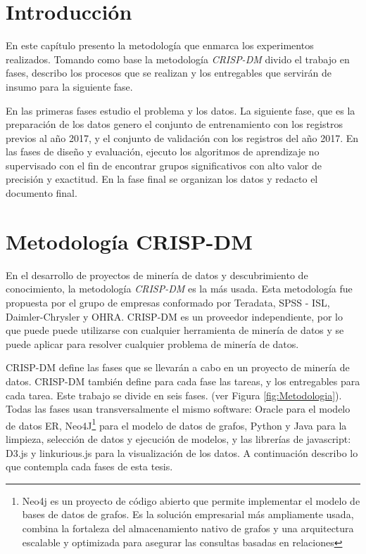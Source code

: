 \section{Introducción}
En este capítulo presento la metodología que enmarca los experimentos realizados. Tomando como base la metodología \textit{\acrfull{CRISP-DM}} divido el trabajo en fases, describo los procesos que se realizan y los entregables que servirán de insumo para la siguiente fase.

En las primeras fases estudio el problema y los datos. La siguiente fase, que es la preparación de los datos genero el conjunto de entrenamiento con los registros previos al año 2017, y el conjunto de validación con los registros del año 2017. En las fases de diseño y evaluación, ejecuto los algoritmos de aprendizaje no supervisado con el fin de encontrar grupos significativos con alto valor de precisión y exactitud. En la fase final se organizan los datos y  redacto el documento final.

\section{Metodología CRISP-DM}
En el desarrollo de proyectos de minería de datos y descubrimiento de conocimiento, la metodología \textit{\acrfull{CRISP-DM}} es la más usada. Esta metodología fue propuesta por el grupo de empresas conformado por Teradata,
SPSS - ISL, Daimler-Chrysler y OHRA. \acrshort{CRISP-DM} es un proveedor independiente, por lo que puede
puede utilizarse con cualquier herramienta de minería de datos y se puede aplicar para resolver cualquier problema de minería de datos.\cite{Marbn2009AModel}

\acrshort{CRISP-DM} define las fases que se llevarán a cabo en un proyecto de minería de datos. \acrshort{CRISP-DM} también define para cada fase las tareas, y los entregables para cada tarea. Este trabajo se divide en seis fases.
(ver Figura \ref{fig:Metodologia}). Todas las fases usan transversalmente el mismo software: Oracle para el modelo de datos ER, Neo4J\footnote{Neo4j es un proyecto de código abierto que permite implementar el modelo de bases de datos de grafos. Es la solución empresarial más ampliamente usada, combina la fortaleza del almacenamiento nativo de grafos y una arquitectura escalable y optimizada para asegurar las consultas basadas en relaciones} para el modelo de datos de grafos, Python y Java para la limpieza, selección de datos y ejecución de modelos, y las librerías de javascript: D3.js y linkurious.js para la visualización de los datos. 
A continuación describo lo que contempla cada fases de esta tesis.

